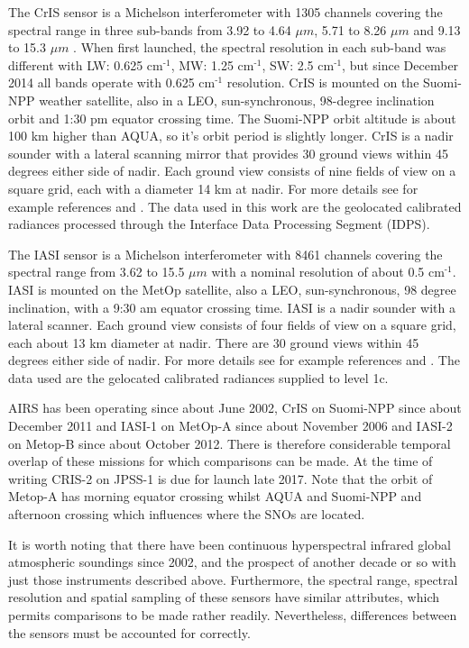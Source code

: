 \documentclass[11pt]{article}
\begin{document}
The CrIS sensor is a Michelson interferometer with 1305 channels covering the spectral range in three sub-bands from 3.92 to 4.64 \(\mu m\), 5.71 to 8.26 \(\mu m\) and 9.13 to 15.3 \(\mu m\) . When first launched, the spectral resolution in each sub-band was different with LW: 0.625 cm\(^{\text{-1}}\), MW: 1.25 cm\(^{\text{-1}}\), SW: 2.5 cm\(^{\text{-1}}\), but since December 2014 all bands operate with 0.625 cm\(^{\text{-1}}\) resolution. CrIS is mounted on the Suomi-NPP weather satellite, also in a LEO, sun-synchronous, 98-degree inclination orbit and 1:30 pm equator crossing time. The Suomi-NPP orbit altitude is about 100 km higher than AQUA, so it's orbit period is slightly longer. CrIS is a nadir sounder with a lateral scanning mirror that provides 30 ground views within 45 degrees either side of nadir. Each ground view consists of nine fields of view on a square grid, each with a diameter 14 km at nadir. For more details see for example references \cite{crisweb} and \cite{criscal}. The data used in this work are the geolocated calibrated radiances processed through the Interface Data Processing Segment (IDPS).

The IASI sensor is a Michelson interferometer with 8461 channels covering the spectral range from 3.62 to 15.5 \(\mu m\) with a nominal resolution of about 0.5 cm\(^{\text{-1}}\). IASI is mounted on the MetOp satellite, also a LEO, sun-synchronous, 98 degree inclination, with a 9:30 am equator crossing time. IASI is a nadir sounder with a lateral scanner. Each ground view consists of four fields of view on a square grid, each about 13 km diameter at nadir. There are 30 ground views within 45 degrees either side of nadir. For more details see for example references \cite{iasiweb} and \cite{iasiover}. The data used are the gelocated calibrated radiances supplied to level 1c.

AIRS has been operating since about June 2002, CrIS on Suomi-NPP since about December 2011 and IASI-1 on MetOp-A since about November 2006 and IASI-2 on Metop-B since about October 2012. There is therefore considerable temporal overlap of these missions for which comparisons can be made. At the time of writing CRIS-2 on JPSS-1 is due for launch late 2017. Note that the orbit of Metop-A has morning equator crossing whilst AQUA and Suomi-NPP and afternoon crossing which influences where the SNOs are located.

It is worth noting that there have been continuous hyperspectral infrared global atmospheric soundings since 2002, and the prospect of another decade or so with just those instruments described above. Furthermore, the spectral range, spectral resolution and spatial sampling of these sensors have similar attributes, which permits comparisons to be made rather readily. Nevertheless, differences between the sensors must be accounted for correctly.
\end{document}
